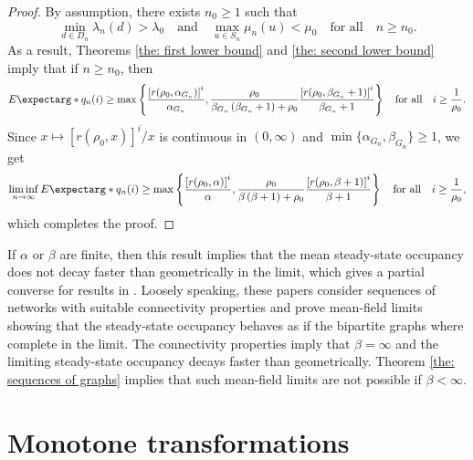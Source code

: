 \documentclass[a4paper, 12pt]{article}
\theoremstyle{definition}
\newcommand{\expect}{E\expectarg}
\begin{document}
\begin{proof}
	By assumption, there exists $n_0 \geq 1$ such that
	\begin{equation*}
		\min_{d \in D_n} \lambda_n(d) > \lambda_0 \quad \text{and} \quad \max_{u \in S_n} \mu_n(u) < \mu_0 \quad \text{for all} \quad n \geq n_0.
	\end{equation*}
	As a result, Theorems \ref{the: first lower bound} and \ref{the: second lower bound} imply that if $n \geq n_0$, then
	\begin{equation*}
		\expect*{q_n(i)} \geq \max\left\{\frac{\left[r(\rho_0, \alpha_{G_n})\right]^i}{\alpha_{G_n}}, \frac{\rho_0}{\beta_{G_n}\left(\beta_{G_n} + 1\right) + \rho_0}\frac{\left[r(\rho_0, \beta_{G_n} + 1)\right]^i}{\beta_{G_n} + 1}\right\} \quad \text{for all} \quad i \geq \frac{1}{\rho_0}.
	\end{equation*}
	Since $x \mapsto [r(\rho_0, x)]^i / x$ is continuous in $(0, \infty)$ and $\min\{\alpha_{G_n}, \beta_{G_n}\} \geq 1$, we get
	\begin{equation*}
		\liminf_{n \to \infty} \expect*{q_n(i)} \geq \max\left\{\frac{\left[r(\rho_0, \alpha)\right]^i}{\alpha}, \frac{\rho_0}{\beta\left(\beta + 1\right) + \rho_0}\frac{\left[r(\rho_0, \beta + 1)\right]^i}{\beta + 1}\right\} \quad \text{for all} \quad i \geq \frac{1}{\rho_0},
	\end{equation*}
	which completes the proof.
\end{proof}

If $\alpha$ or $\beta$ are finite, then this result implies that the mean steady-state occupancy does not decay faster than geometrically in the limit, which gives a partial converse for results in \cite{weng2020boptimal,rutten2022load,rutten2024mean,zhao2022exploiting,zhao2023optimal, mukherjee2018asymptotically, budhiraja2019supermarket}. Loosely speaking, these papers consider sequences of networks with suitable connectivity properties and prove mean-field limits showing that the steady-state occupancy behaves as if the bipartite graphs where complete in the limit. The connectivity properties imply that $\beta = \infty$ and the limiting steady-state occupancy decays faster than geometrically. Theorem \ref{the: sequences of graphs} implies that such mean-field limits are not possible if $\beta < \infty$.

\section{Monotone transformations}
\label{sec: monotone transformations}
\end{document}

